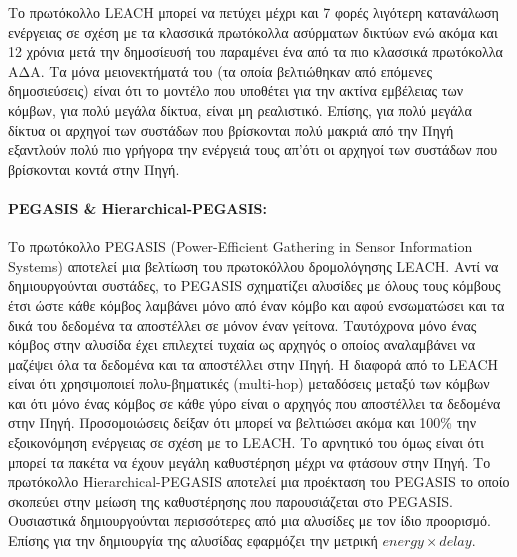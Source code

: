 Το πρωτόκολλο LEACH μπορεί να πετύχει μέχρι και 7 φορές λιγότερη κατανάλωση ενέργειας σε σχέση με τα κλασσικά πρωτόκολλα ασύρματων δικτύων \cite{leach_protocol} ενώ
ακόμα και 12 χρόνια μετά την δημοσίευσή του παραμένει ένα από τα πιο κλασσικά πρωτόκολλα ΑΔΑ. Τα μόνα μειονεκτήματά του (τα οποία βελτιώθηκαν από επόμενες
δημοσιεύσεις) είναι ότι το μοντέλο που υποθέτει για την ακτίνα εμβέλειας των κόμβων, για πολύ μεγάλα δίκτυα, είναι μη ρεαλιστικό. Επίσης, για πολύ μεγάλα δίκτυα οι
αρχηγοί των συστάδων που βρίσκονται πολύ μακριά από την Πηγή εξαντλούν πολύ πιο γρήγορα την ενέργειά τους απ'ότι οι αρχηγοί των συστάδων που βρίσκονται κοντά στην
Πηγή.

\paragraph{PEGASIS \& Hierarchical-PEGASIS:} Το πρωτόκολλο PEGASIS (Power-Efficient Gathering in Sensor Information Systems) \cite{pegasis_protocol} αποτελεί μια
βελτίωση του πρωτοκόλλου δρομολόγησης LEACH. Αντί να δημιουργούνται συστάδες, το PEGASIS σχηματίζει αλυσίδες με όλους τους κόμβους έτσι ώστε κάθε κόμβος λαμβάνει μόνο
από έναν κόμβο και αφού ενσωματώσει και τα δικά του δεδομένα τα αποστέλλει σε μόνον έναν γείτονα. Ταυτόχρονα μόνο ένας κόμβος στην αλυσίδα έχει επιλεχτεί τυχαία ως
αρχηγός ο οποίος αναλαμβάνει να μαζέψει όλα τα δεδομένα και τα αποστέλλει στην Πηγή. Η διαφορά από το LEACH είναι ότι χρησιμοποιεί πολυ-βηματικές (multi-hop)
μεταδόσεις μεταξύ των κόμβων και ότι μόνο ένας κόμβος σε κάθε γύρο είναι ο αρχηγός που αποστέλλει τα δεδομένα στην Πηγή. Προσομοιώσεις δείξαν ότι μπορεί να βελτιώσει
ακόμα και 100\% την εξοικονόμηση ενέργειας σε σχέση με το LEACH. Το αρνητικό του όμως είναι ότι μπορεί τα πακέτα να έχουν μεγάλη καθυστέρηση μέχρι να φτάσουν στην
Πηγή. Το πρωτόκολλο Hierarchical-PEGASIS \cite{hierarchical_pegasis} αποτελεί μια προέκταση του PEGASIS το οποίο σκοπεύει στην μείωση της καθυστέρησης που
παρουσιάζεται στο PEGASIS. Ουσιαστικά δημιουργούνται περισσότερες από μια αλυσίδες με τον ίδιο προορισμό. Επίσης για την δημιουργία της αλυσίδας εφαρμόζει την μετρική
$energy\times delay$.

